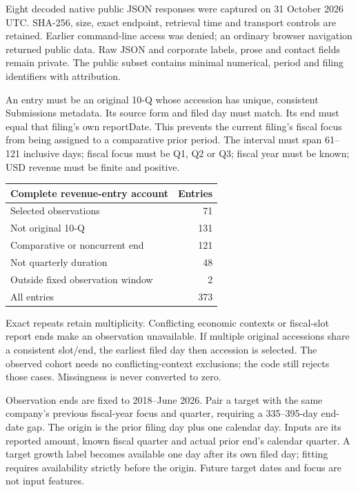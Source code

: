 \documentclass[11pt,letterpaper]{article}
\newcommand{\heading}[1]{\vspace{4pt}{\large\bfseries #1}\par}
\newcommand{\BoundI}{71}
\newcommand{\BoundJ}{131}
\newcommand{\BoundK}{121}
\newcommand{\BoundL}{48}
\newcommand{\BoundM}{2}
\newcommand{\BoundN}{373}
\begin{document}
\newpage
\heading{Source identity and complete observation accounting}
Eight decoded native public JSON responses were captured on 31 October 2026 UTC. SHA-256, size, exact endpoint, retrieval time and transport controls are retained. Earlier command-line access was denied; an ordinary browser navigation returned public data. Raw JSON and corporate labels, prose and contact fields remain private. The public subset contains minimal numerical, period and filing identifiers with attribution.

An entry must be an original 10-Q whose accession has unique, consistent Submissions metadata. Its source form and filed day must match. Its end must equal that filing's own reportDate. This prevents the current filing's fiscal focus from being assigned to a comparative prior period. The interval must span 61--121 inclusive days; fiscal focus must be Q1, Q2 or Q3; fiscal year must be known; USD revenue must be finite and positive.

\begin{center}\begin{tabular}{lr}\toprule
Complete revenue-entry account & Entries\\\midrule
Selected observations & \BoundI{}\\
Not original 10-Q & \BoundJ{}\\
Comparative or noncurrent end & \BoundK{}\\
Not quarterly duration & \BoundL{}\\
Outside fixed observation window & \BoundM{}\\\midrule
All entries & \BoundN{}\\\bottomrule\end{tabular}\end{center}
Exact repeats retain multiplicity. Conflicting economic contexts or fiscal-slot report ends make an observation unavailable. If multiple original accessions share a consistent slot/end, the earliest filed day then accession is selected. The observed cohort needs no conflicting-context exclusions; the code still rejects those cases. Missingness is never converted to zero.

\heading{Origin, label availability and temporal protection}
Observation ends are fixed to 2018--June 2026. Pair a target with the same company's previous fiscal-year focus and quarter, requiring a 335--395-day end-date gap. The origin is the prior filing day plus one calendar day. Inputs are its reported amount, known fiscal quarter and actual prior end's calendar quarter. A target growth label becomes available one day after its own filed day; fitting requires availability strictly before the origin. Future target dates and focus are not input features.
\end{document}

